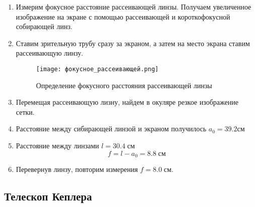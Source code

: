 \documentclass[12pt,a4paper]{article}
\begin{document}
\begin{enumerate}
    \item  Измерим фокусное расстояние рассеивающей линзы. Получаем увеличенное изображение на экране с помощью рассеивающей и короткофокусной собирающей линз.
    \item Ставим зрительную трубу сразу за экраном, а затем на место экрана ставим рассеивающую линзу. 
    \begin{figure}[H]
        \begin{center}
        \texttt{[image: фокусное\_рассеивающей.png]}
        \caption{ Определение фокусного расстояния рассеивающей линзы}
        \label{focus} %
        \end{center}
    \end{figure}
    \item Перемещая рассеивающую лизну, найдем в окуляре резкое изображение сетки.
    \item Расстояние между сибирающей линзой и экраном получилось $ a_0 = 39.2 см$
    \item Расстояние между линзами $ l = 30.4 \; см$
    \begin{equation}
        f = l - a_0  = 8.8 \; см
    \end{equation}
    \item  Перевернув линзу, повторим измерения $f = 8.0 \; см$.
\end{enumerate}

\subsection{Телескоп Кеплера}
\end{document}
